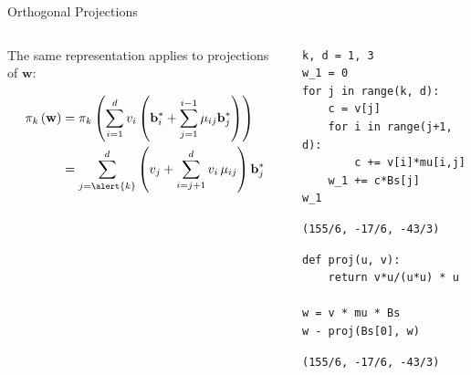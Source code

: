 \documentclass[presentation,smaller]{beamer}
\renewcommand{\vec}[1]{\mathbf{#1}\xspace}
\begin{document}
\begin{frame}[fragile,label={sec:org6ad0225}]{Orthogonal Projections}
 \begin{columns}[t]
\begin{column}{0.55\columnwidth}
The same representation applies to projections of \(\vec{w}\):

\begin{align*}
\pi_k\left(\vec{w}\right) &= \pi_k\left(\sum_{i=1}^{d} v_i \left(\vec{b}_i^* + \sum_{j=1}^{i-1} \mu_{ij} \vec{b}_j^* \right)\right)\\
                        &= \sum_{j=\alert{k}}^{d} \left(v_j  + \sum_{i=j+1}^{d} v_i\, \mu_{ij} \right) \vec{b}_j^*
\end{align*}
\end{column}

\begin{column}{0.45\columnwidth}
\lstset{language=sage,label= ,caption= ,captionpos=b,numbers=none}
\begin{lstlisting}
k, d = 1, 3
w_1 = 0
for j in range(k, d):
    c = v[j]
    for i in range(j+1, d):
        c += v[i]*mu[i,j]
    w_1 += c*Bs[j]
w_1
\end{lstlisting}

\begin{verbatim}
(155/6, -17/6, -43/3)
\end{verbatim}

\lstset{language=sage,label= ,caption= ,captionpos=b,numbers=none}
\begin{lstlisting}
def proj(u, v):
    return v*u/(u*u) * u

w = v * mu * Bs
w - proj(Bs[0], w)
\end{lstlisting}

\begin{verbatim}
(155/6, -17/6, -43/3)
\end{verbatim}
\end{column}
\end{columns}
\end{frame}
\end{document}
